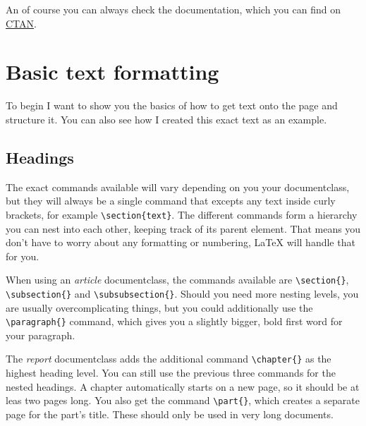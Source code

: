 \documentclass[	%
		fontsize=11pt,  %
		a4paper,	    %
		english,		%
		sans,			%
		f1,				%
	]{HsH-report}		%
\begin{document}
		An of course you can always check the documentation, which you can find on \href{https://ctan.org/}{CTAN}.


\chapter{Basic text formatting} \label{chap: formating}

	To begin I want to show you the basics of how to get text onto the page and structure it. You can also see how I created this exact text as an
	example.

	\section{Headings} \label{sec: headings}
		The exact commands available will vary depending on you your documentclass, but they will always be a single command that excepts any text
		inside curly brackets, for example \lstinline|\section{text}|. The different commands form a hierarchy you can nest into each other, keeping
		track of its parent element. That means you don't have to worry about any formatting or numbering, LaTeX will handle that for you.

		When using an \emph{article} documentclass, the commands available are \lstinline|\section{}|, \lstinline|\subsection{}| and
		\lstinline|\subsubsection{}|. Should you need more nesting levels, you are usually overcomplicating things, but you could additionally use the
		\lstinline|\paragraph{}| command, which gives you a slightly bigger, bold first word for your paragraph.

		The \emph{report} documentclass adds the additional command \lstinline|\chapter{}| as the highest heading level. You can still use the previous
		three commands for the nested headings. A chapter automatically starts on a new page, so it should be at leas two pages long. You also get the
		command \lstinline|\part{}|, which creates a separate page for the part's title. These should only be used in very long documents.
\end{document}
